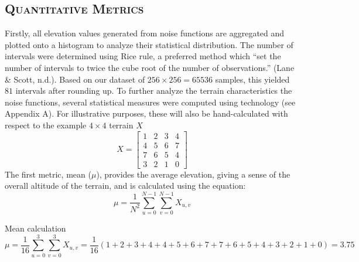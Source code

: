 \subsection{\textsc{Quantitative Metrics}} \label{quant_metrics}
\vspace*{-10pt}

Firstly, all elevation values generated from noise functions are aggregated and plotted onto a histogram to analyze their statistical distribution. The 
number of intervals were determined using Rice rule, a preferred method which “set the number of intervals to twice the cube root of the number of 
observations.” (Lane \& Scott, n.d.). Based on our dataset of $256\times256=65536$ samples, this yielded $81$ intervals after rounding up. To further analyze 
the terrain characteristics the noise functions, several statistical measures were computed using technology (see Appendix A). For illustrative purposes, 
these will also be hand-calculated with respect to the example $4\times4$ terrain $X$
\begin{equation*}
    X=
    \begin{bmatrix}
        1 & 2 & 3 & 4\\
        4 & 5 & 6 & 7\\
        7 & 6 & 5 & 4\\
        3 & 2 & 1 & 0
    \end{bmatrix}
\end{equation*}
The first metric, mean ($\mu$), provides the average elevation, giving a sense of the overall altitude of the 
terrain, and is calculated using the equation:
\[\mu=\frac{1}{N^2}\sum_{u=0}^{N-1}\sum_{v=0}^{N-1}X_{u,v}\]
\begin{example}{Mean calculation}
    \[\mu=\frac{1}{16}\sum_{u=0}^{3}\sum_{v=0}^{3}X_{u,v}=\frac{1}{16}(1+2+3+4+4+5+6+7+7+6+5+4+3+2+1+0)=3.75\]
\end{example}

